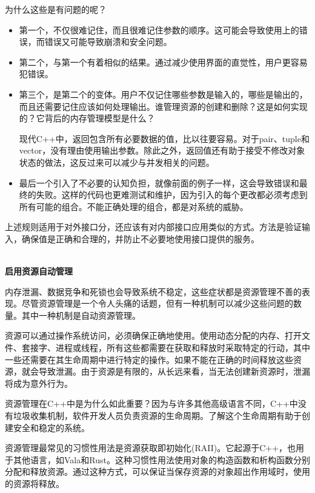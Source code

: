 为什么这些是有问题的呢？

\begin{itemize}
\item 
第一个，不仅很难记住，而且很难记住参数的顺序。这可能会导致使用上的错误，而错误又可能导致崩溃和安全问题。

\item 
第二个，与第一个有着相似的结果。通过减少使用界面的直觉性，用户更容易犯错误。

\item 
第三个，是第二个的变体。用户不仅记住哪些参数是输入的，哪些是输出的，而且还需要记住应该如何处理输出。谁管理资源的创建和删除？这是如何实现的？它背后的内存管理模型是什么？

现代C++中，返回包含所有必要数据的值，比以往要容易。对于pair、tuple和vector，没有理由使用输出参数。除此之外，返回值还有助于接受不修改对象状态的做法，这反过来可以减少与并发相关的问题。

\item 
最后一个引入了不必要的认知负担，就像前面的例子一样，这会导致错误和最终的失败。这样的代码也更难测试和维护，因为引入的每个更改都必须考虑到所有可能的组合。不能正确处理的组合，都是对系统的威胁。
\end{itemize}

上述规则适用于对外接口分，还应该有对内部接口应用类似的方式。方法是验证输入，确保值是正确和合理的，并防止不必要地使用接口提供的服务。

\hspace*{\fill} \\ %
\noindent
\textbf{启用资源自动管理}

内存泄漏、数据竞争和死锁也会导致系统不稳定，这些症状都是资源管理不善的表现。尽管资源管理是一个令人头痛的话题，但有一种机制可以减少这些问题的数量。其中一种机制是自动资源管理。

资源可以通过操作系统访问，必须确保正确地使用。使用动态分配的内存、打开文件、套接字、进程或线程，所有这些都需要在获取和释放时采取特定的行动，其中一些还需要在其生命周期中进行特定的操作。如果不能在正确的时间释放这些资源，就会导致泄漏。由于资源是有限的，从长远来看，当无法创建新资源时，泄漏将成为意外行为。 

资源管理在C++中是为什么如此重要？因为与许多其他高级语言不同，C++中没有垃圾收集机制，软件开发人员负责资源的生命周期。了解这个生命周期有助于创建安全和稳定的系统。

资源管理最常见的习惯性用法是资源获取即初始化(RAII)。它起源于C++，也用于其他语言，如Vala和Rust。这种习惯性用法使用对象的构造函数和析构函数分别分配和释放资源。通过这种方式，可以保证当保存资源的对象超出作用域时，使用的资源将释放。

